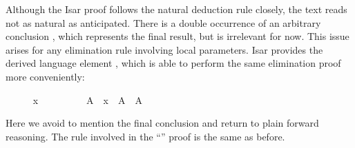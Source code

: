 \begin{isabellebody}
\begin{minipage}{0.4\textwidth}
\isamarkuptrue%
%
\end{minipage}
%
\begin{isamarkuptext}%
\medskip\noindent Although the Isar proof follows the natural
  deduction rule closely, the text reads not as natural as
  anticipated.  There is a double occurrence of an arbitrary
  conclusion , which represents the final result, but is
  irrelevant for now.  This issue arises for any elimination rule
  involving local parameters.  Isar provides the derived language
  element \hyperlink{command.obtain}{\mbox{}}, which is able to perform the same
  elimination proof more conveniently:%
\end{isamarkuptext}%
\isamarkuptrue%
%
\isadelimproof
%
\endisadelimproof
%
\isatagproof
\ \ \ \ \isamarkupfalse%
\ {\isachardoublequoteopen}x\ {\isasymin}\ {\isasymUnion}{\isasymA}{\isachardoublequoteclose}\isanewline
\ \ \ \ \isamarkupfalse%
\ \isamarkupfalse%
\ A\ \ {\isachardoublequoteopen}x\ {\isasymin}\ A{\isachardoublequoteclose}\ \ {\isachardoublequoteopen}A\ {\isasymin}\ {\isasymA}{\isachardoublequoteclose}\ \isacommand{{\isachardot}{\isachardot}}\isamarkupfalse%
%
\endisatagproof
{\isafoldproof}%
%
\isadelimproof
%
\endisadelimproof
%
\begin{isamarkuptext}%
\noindent Here we avoid to mention the final conclusion 
  and return to plain forward reasoning.  The rule involved in the
  ``\hyperlink{command.ddot}{\mbox{\isa{\isacommand{{\isachardot}{\isachardot}}}}}'' proof is the same as before.%
\end{isamarkuptext}%
\isamarkuptrue%
%
\isadelimtheory
%
\endisadelimtheory
%
\isatagtheory
{}\isamarkupfalse%
%
\endisatagtheory
{\isafoldtheory}%
%
\isadelimtheory
%
\endisadelimtheory
\isanewline
\end{isabellebody}%
